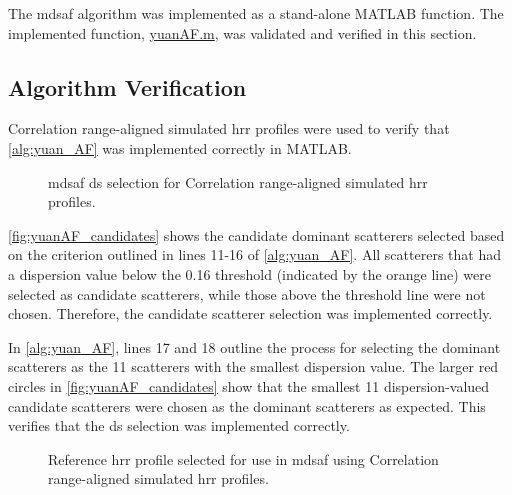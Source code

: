\documentclass[class=report,11pt,crop=false]{standalone}
\begin{document}
    The \gls{mdsaf} algorithm was implemented as a stand-alone \textsc{MATLAB} function. The implemented function, \href{}{yuanAF.m}, was validated and verified in this section.
    \subsection{Algorithm Verification}
    Correlation range-aligned simulated \gls{hrr} profiles were used to verify that \autoref{alg:yuan_AF} was implemented correctly in \textsc{MATLAB}.
    
    \begin{figure}[H]
        \centering
        \resizebox{0.45\linewidth}{!}{}
        \caption{\gls{mdsaf} \gls{ds} selection for Correlation range-aligned simulated \gls{hrr}  profiles.}
        \label{fig:yuanAF_candidates}
    \end{figure}

    \autoref{fig:yuanAF_candidates} shows the candidate dominant scatterers selected based on the criterion outlined in lines 11-16 of \autoref{alg:yuan_AF}. All scatterers that had a dispersion value below the 0.16 threshold (indicated by the orange line) were selected as candidate scatterers, while those above the threshold line were not chosen. Therefore, the candidate scatterer selection was implemented correctly. 

    In \autoref{alg:yuan_AF}, lines 17 and 18 outline the process for selecting the dominant scatterers as the 11 scatterers with the smallest dispersion value. The larger red circles in \autoref{fig:yuanAF_candidates} show that the smallest 11 dispersion-valued candidate scatterers were chosen as the dominant scatterers as expected. This verifies that the \gls{ds} selection was implemented correctly.

    \begin{figure}[H]
        \centering
        \resizebox{0.45\linewidth}{!}{}
        \caption{Reference \gls{hrr} profile selected for use in \gls{mdsaf} using Correlation range-aligned simulated \gls{hrr} profiles.}
        \label{fig:yuanAF_refProfile}
    \end{figure}
\end{document}
